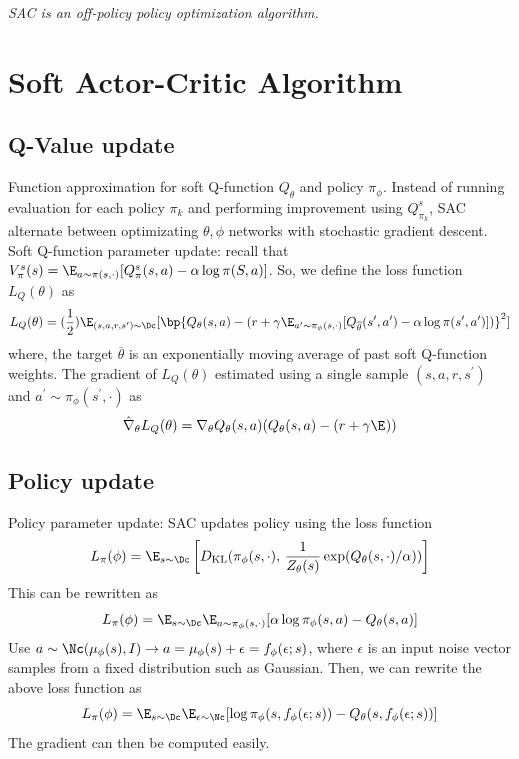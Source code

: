 \noindent \textit{SAC is an off-policy policy optimization algorithm.}

\section{Soft Actor-Critic Algorithm}
\subsection{Q-Value update}
Function approximation for soft Q-function $Q_\theta$ and policy $\pi_\phi$. Instead of running evaluation for each policy $\pi_k$ and performing 
improvement using $Q_{\pi_k}^s$, SAC alternate between optimizating $\theta, \phi$ networks with stochastic gradient descent. \\ 

\noindent Soft Q-function parameter update: recall that $V_\pi^s(s) = \E_{a\sim\pi(s,\cdot)}[Q_\pi^s(s, a) - \alpha \log \pi(S, a)]$. So, we define the loss function $L_Q(\theta)$ as 
\[
  L_Q(\theta) = (\frac{1}{2})\E_{(s,a,r,s^{\prime})\sim\Dc} [\bp{Q_\theta(s,a) - (r + \gamma \E_{a^{\prime} \sim \pi_\phi(s, \cdot)}[Q_{\overline{\theta}}(s^{\prime}, a^{\prime}) - \alpha \log \pi(s^{\prime}, a^{\prime})])}^2]
\] 
where, the target $\overline{\theta}$ is an exponentially moving average of past soft Q-function weights. The gradient of $L_Q(\theta)$ estimated using a single sample $(s, a, r, s^{\prime})$ and $a^{\prime}\sim\pi_\phi(s^{\prime}, \cdot)$ as 
\[
  \hat{\nabla}_\theta L_Q(\theta) = \nabla_\theta Q_\theta(s, a)(Q_\theta(s,a) - (r + \gamma \E_{})) %
\] 

\subsection{Policy update}
Policy parameter update: SAC updates policy using the loss function 
\[
  L_\pi(\phi) = \E_{s\sim\Dc} \left[ D_{\text{KL}}(\pi_\phi(s, \cdot), \, \frac{1}{Z_\theta(s)} \exp(Q_\theta(s, \cdot) / \alpha)) \right] 
\] 
This can be rewritten as 
\[
  L_\pi(\phi) = \E_{s\sim\Dc}\E_{a \sim\pi_\phi(s, \cdot)} [ \alpha \log \pi_\phi(s, a) - Q_\theta(s, a)] 
\] 
Use $a \sim \Nc(\mu_\phi(s), I) \rightarrow a = \mu_\phi(s) + \epsilon = f_\phi(\epsilon; s)$, where $\epsilon$ is an input noise vector samples from a fixed distribution such as Gaussian. Then, 
we can rewrite the above loss function as 
\[
  L_\pi(\phi) = \E_{s \sim \Dc} \E_{\epsilon \sim \Nc}[\log \pi_\phi(s, f_\phi(\epsilon; s)) - Q_\theta(s, f_\phi(\epsilon; s))] 
\] 
The gradient can then be computed easily.

